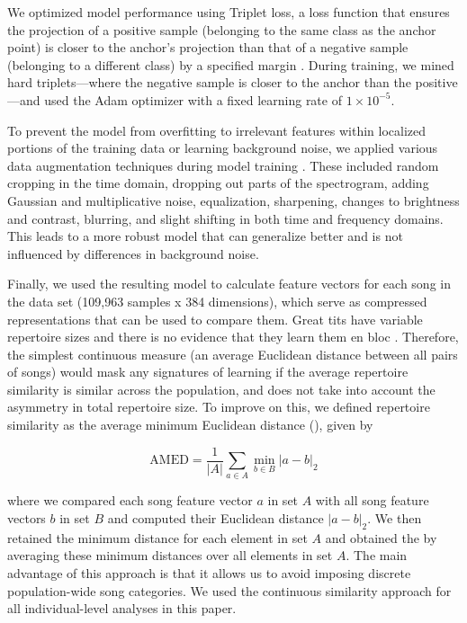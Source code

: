 \documentclass[9pt, onecolumn, twoside, lineno]{gsajnl}
\begin{document}
We optimized model performance using Triplet loss, a loss function that ensures the projection of a positive sample (belonging to the same class as the anchor point) is closer to the anchor's projection than that of a negative sample (belonging to a different class) by a specified margin \autocite{hermans2017, hoffer2018}. During training, we mined hard triplets---where the negative sample is closer to the anchor than the positive---and used the Adam optimizer with a fixed learning rate of $1 \times 10^{-5}$.

To prevent the model from overfitting to irrelevant features within localized portions of the training data or learning background noise, we applied various data augmentation techniques during model training \autocite{mumuni2022,perez2017,shorten2019}. These included random cropping in the time domain, dropping out parts of the spectrogram, adding Gaussian and multiplicative noise, equalization, sharpening, changes to brightness and contrast, blurring, and slight shifting in both time and frequency domains. This leads to a more robust model that can generalize better and is not influenced by differences in background noise.

Finally, we used the resulting model to calculate feature vectors for each song in the data set (109,963 samples x 384 dimensions), which serve as compressed representations that can be used to compare them. Great tits have variable repertoire sizes and there is no evidence that they learn them en bloc \autocite{mcgregor1982b, rivera-gutierrez2010a}. Therefore, the simplest continuous measure (an average Euclidean distance between all pairs of songs) would mask any signatures of learning if the average repertoire similarity is similar across the population, and does not take into account the asymmetry in total repertoire size. To improve on this, we defined repertoire similarity as the average minimum Euclidean distance (), given by

\begin{equation} 
\label{eq1}
\text{AMED} = \frac{1}{|A|} \sum_{a \in A} \min_{b \in B} \left| a - b \right|_2
\end{equation}

where we compared each song feature vector $a$ in set $A$ with all song feature vectors $b$ in set $B$ and computed their Euclidean distance $\left| a - b \right|_2$. We then retained the minimum distance for each element in set $A$ and obtained the  by averaging these minimum distances over all elements in set $A$.
The main advantage of this approach is that it allows us to avoid imposing discrete population-wide song categories. We used the continuous similarity approach for all individual-level analyses in this paper. 
\end{document}
